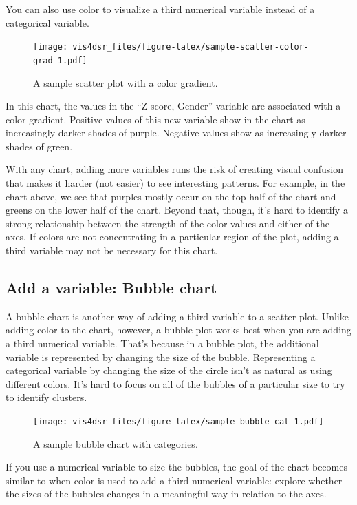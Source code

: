 \documentclass[
]{krantz}
\begin{document}
You can also use color to visualize a third numerical variable instead of a
categorical variable.

\begin{figure}
\centering
\texttt{[image: vis4dsr\_files/figure-latex/sample-scatter-color-grad-1.pdf]}
\caption{\label{fig:sample-scatter-color-grad}A sample scatter plot with a color gradient.}
\end{figure}

In this chart, the values in the ``Z-score, Gender'' variable are associated with
a color gradient. Positive values of this new variable show in the chart as
increasingly darker shades of purple. Negative values show as increasingly darker
shades of green.

With any chart, adding more variables runs the risk of creating visual confusion
that makes it harder (not easier) to see interesting patterns. For example,
in the chart above, we see that purples mostly occur on the top half of the chart
and greens on the lower half of the chart. Beyond that, though, it's hard to identify
a strong relationship between the strength of the color values and either of the axes.
If colors are not concentrating in a particular region of the plot, adding a third
variable may not be necessary for this chart.

\hypertarget{add-a-variable-bubble-chart}{%
\subsection{Add a variable: Bubble chart}\label{add-a-variable-bubble-chart}}

A bubble chart is another way of adding a third variable to a scatter plot. Unlike
adding color to the chart, however, a bubble plot works best when you are adding a
third numerical variable. That's because in a bubble plot, the additional variable
is represented by changing the size of the bubble. Representing a categorical variable
by changing the size of the circle isn't as natural as using different colors. It's
hard to focus on all of the bubbles of a particular size to try to identify clusters.

\begin{figure}
\centering
\texttt{[image: vis4dsr\_files/figure-latex/sample-bubble-cat-1.pdf]}
\caption{\label{fig:sample-bubble-cat}A sample bubble chart with categories.}
\end{figure}

If you use a numerical variable to size the bubbles, the goal of the chart becomes
similar to when color is used to add a third numerical variable: explore whether
the sizes of the bubbles changes in a meaningful way in relation to the axes.
\end{document}
